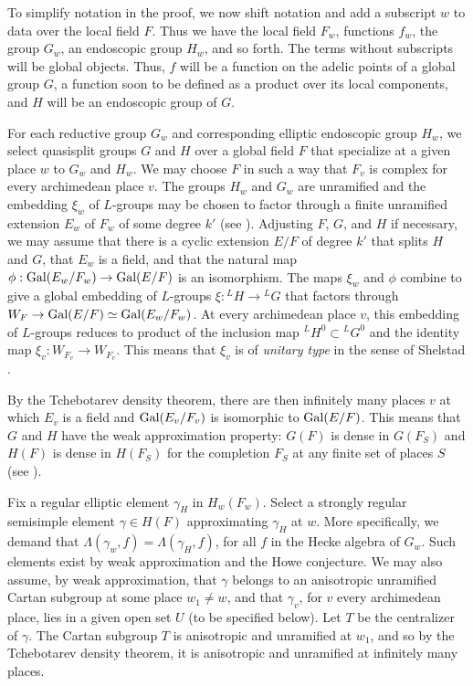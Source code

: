 To simplify notation in the proof, we now shift notation and add a subscript
$w$ to data over the local field $F$.  Thus we have the
local field $F_w$, functions $f_w$, the group $G_w$, an endoscopic
group $H_w$, and so forth.  The terms without subscripts
will be global objects.  Thus, $f$ will be a function on the
adelic points of a global group $G$, a function 
soon to be defined as a product over its
local components, and $H$ will be an endoscopic
group of $G$.

For each reductive group $G_w$ and corresponding elliptic
endoscopic group $H_w$, we
select quasisplit groups $G$ and $H$ over a global field
$F$ that specialize at a given
place $w$ to $G_w$ and $H_w$.  We may choose $F$ in
such a way that $F_v$ is complex for every archimedean place $v$.
The groups $H_w$ and $G_w$ are unramified and the embedding $\xi_w$ of
$L$-groups may be chosen to factor
through a finite unramified extension
$E_w$ of $F_w$ of some degree $k'$  (see \cite{H2}).  Adjusting
$F$, $G$, and $H$ if necessary, we may assume that there is a 
cyclic extension $E/F$ of degree $k'$ that splits $H$ and $G$,
that $E_w$ is a field, and that
the natural map $\phi:\text{Gal}(E_w/F_w)\to \text{Gal}(E/F)$ is an
isomorphism.  The maps $\xi_w$ and $\phi$ combine to give
a global embedding of $L$-groups $\xi:{}^LH\to{}^LG$ that
factors through $W_F\to \text{Gal}(E/F)\simeq \text{Gal}(E_w/F_w)$.  
At every archimedean place $v$,
this embedding of $L$-groups reduces to product of the inclusion
map ${}^LH^0\subset {}^LG^0$ and the identity map $\xi_v:W_{F_v}\to W_{F_v}$.
This means that $\xi_v$ is of {\it unitary type\/} in the sense
of Shelstad \cite{Sh3}.

By the Tchebotarev density theorem, there are then infinitely many places
$v$ at which $E_v$ is a field and $\text{Gal}(E_v/F_v)$ is isomorphic
to $\text{Gal}(E/F)$.  This means that $G$ and $H$ have the weak approximation
property:  $G(F)$ is dense in $G(F_S)$ and $H(F)$ is dense in $H(F_S)$
for the completion $F_S$ at any finite set of places $S$ (see
\cite{KR}).


Fix a regular elliptic element $\gamma_H$ in $H_w(F_w)$.
Select a strongly regular semisimple element
$\gamma\in H(F)$ approximating $\gamma_H$ at $w$.  More specifically,
we demand that $\Lambda(\gamma_w,f) = \Lambda(\gamma_H,f)$,
for all $f$ in the Hecke algebra of $G_w$.
Such elements exist by weak approximation
and the Howe conjecture.  We may also assume, by weak approximation,
that $\gamma$ belongs to an anisotropic unramified Cartan subgroup
at some place $w_1\ne w$, and that $\gamma_v$, for $v$ every archimedean
place, lies in a given open set $U$ (to be specified below).
Let $T$ be the centralizer of $\gamma$.  The Cartan subgroup $T$
is anisotropic and unramified at $w_1$, and so by the Tchebotarev
density theorem, it is anisotropic and unramified at infinitely
many places.

